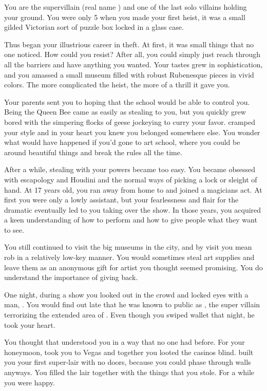 \documentclass[char]{LRSguildcamp1}
\begin{document}
\name{\cGrandma{}}

You are the supervillain \cGrandma{\MYsupername} (real name \cGrandma{\intro}) and one of the last solo villains holding your ground. You were only 5 when you made your first heist, it was a small gilded Victorian sort of puzzle box locked in a glass case. 

Thus began your illustrious career in theft. At first, it was small things that no one noticed. How could you resist? After all, you could simply just reach through all the barriers and have anything you wanted. Your tastes grew in sophistication, and you amassed a small museum filled with robust Rubenesque pieces in vivid colors. The more complicated the heist, the more of a thrill it gave you. 

Your parents sent you to \pSuperSchool{} hoping that the school would be able to control you. Being the Queen Bee came as  easily as stealing to you, but you quickly grew bored with the simpering flocks of geese jockeying to curry your favor. \pSuperSchool{} cramped your style and in your heart you knew you belonged somewhere else. You wonder what would have happened if you'd gone to art school, where you could be around beautiful things and break the rules all the time. 

After a while, stealing with your powers became too easy. You became obsessed with escapology and Houdini and the normal ways of picking a lock or sleight of hand. At 17 years old, you ran away from home to \pCityGrandma{} and joined a magicians act. At first you were only a lowly assistant, but your fearlessness and flair for the dramatic eventually led to you taking over the show. In those years, you acquired a keen understanding of how to perform and how to give people what they want to see. 

You still continued to visit the big museums in the city, and by visit you mean rob in a relatively low-key manner. You would sometimes steal art supplies and leave them as an anonymous gift for artist you thought seemed promising. You do understand the importance of giving back. 

One night, during a show you looked out in the crowd and locked eyes with a man, \cGS{\intro}. You would find out late that he was known to public as \cGS{}, the super villain terrorizing the extended area of \pCityO{}. Even though you swiped \cGS{\their} wallet that night, he took your heart. 

You thought that \cGS{\intro} understood you in a way that no one had before. For your honeymoon, \cGS{\they} took you to Vegas and together you looted the casinos blind. \cGS{\They} built you your first super-lair with no doors, because you could phase through walls anyways. You filled the lair together with the things that you stole. For a while you were happy. 
\end{document}
